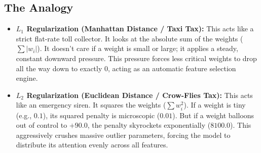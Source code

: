 \documentclass[12pt,a4paper]{article}
\begin{document}
\subsection*{The Analogy}
\begin{itemize}
    \item \textbf{$L_1$ Regularization (Manhattan Distance / Taxi Tax):} This acts like a strict flat-rate toll collector. It looks at the absolute sum of the weights ($\sum |w_i|$). It doesn't care if a weight is small or large; it applies a steady, constant downward pressure. This pressure forces less critical weights to drop all the way down to exactly 0, acting as an automatic feature selection engine.
    \item \textbf{$L_2$ Regularization (Euclidean Distance / Crow-Flies Tax):} This acts like an emergency siren. It squares the weights ($\sum w_i^2$). If a weight is tiny (e.g., $0.1$), its squared penalty is microscopic ($0.01$). But if a weight balloons out of control to $+90.0$, the penalty skyrockets exponentially ($8100.0$). This aggressively crushes massive outlier parameters, forcing the model to distribute its attention evenly across all features.
\end{itemize}
\end{document}

